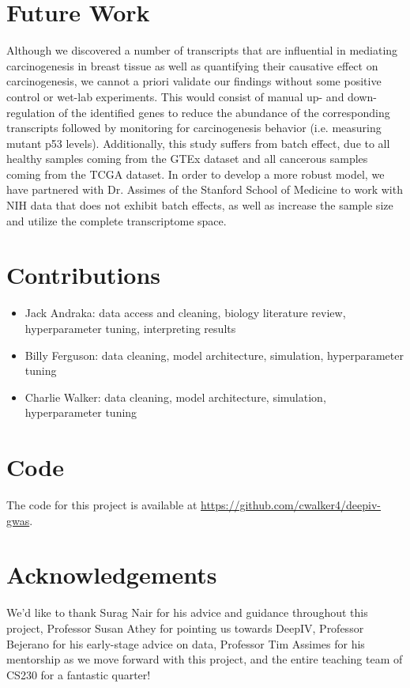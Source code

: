 \documentclass[10.5pt, oneside, twocolumn]{article}   	%
\begin{document}
\section{Future Work}
Although we discovered a number of  transcripts that are influential in mediating carcinogenesis in breast tissue as well as quantifying their causative effect on carcinogenesis, we cannot a priori validate our findings without some positive control or wet-lab experiments. This would consist of manual up- and down-regulation of the identified genes to reduce the abundance of the corresponding transcripts followed by monitoring for carcinogenesis behavior (i.e. measuring mutant p53 levels). Additionally, this study suffers from batch effect, due to all healthy samples coming from the GTEx dataset and all cancerous samples coming from the TCGA dataset. In order to develop a more robust model, we have partnered with Dr. Assimes of the Stanford School of Medicine to work with NIH data that does not exhibit batch effects, as well as increase the sample size and utilize the complete transcriptome space.


\section{Contributions}
\begin{itemize}
\item Jack Andraka: data access and cleaning, biology literature review, hyperparameter tuning, interpreting results\\
\item Billy Ferguson: data cleaning, model architecture, simulation, hyperparameter tuning\\
\item Charlie Walker: data cleaning, model architecture, simulation, hyperparameter tuning
\end{itemize}

\section{Code}
The code for this project is available at \url{https://github.com/cwalker4/deepiv-gwas}.

\section{Acknowledgements}
We'd like to thank Surag Nair for his advice and guidance throughout this project, Professor Susan Athey for pointing us towards DeepIV, Professor Bejerano for his early-stage advice on data, Professor Tim Assimes for his mentorship as we move forward with this project, and the entire teaching team of CS230 for a fantastic quarter!


\printbibliography
\end{document}
